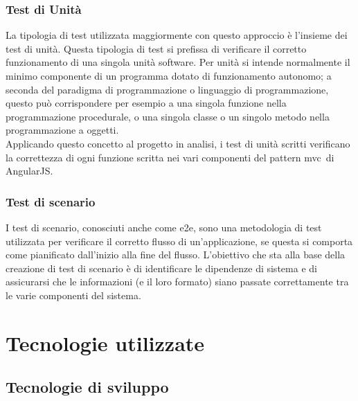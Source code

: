 \subsubsection{Test di Unità}
La tipologia di test utilizzata maggiormente con questo approccio è l'insieme dei test di unità. Questa tipologia di test si prefissa di verificare il corretto funzionamento di una singola unità software. Per unità si intende normalmente il minimo componente di un programma dotato di funzionamento autonomo; a seconda del paradigma di programmazione o linguaggio di programmazione, questo può corrispondere per esempio a una singola funzione nella programmazione procedurale, o una singola classe o un singolo metodo nella programmazione a oggetti.\\
Applicando questo concetto al progetto in analisi, i test di unità scritti verificano la correttezza di ogni funzione scritta nei vari componenti del pattern \gls{mvc}\glsfirstoccur\  di AngularJS. 

\subsubsection{Test di scenario}
I test di scenario, conosciuti anche come \gls{e2e}, sono una metodologia di test utilizzata per verificare il corretto flusso di un’applicazione, se questa si comporta come pianificato dall’inizio alla fine del flusso. L’obiettivo che sta alla base della creazione di test di scenario è di identificare  le dipendenze di sistema e di assicurarsi che le informazioni (e il loro formato) siano passate correttamente tra le varie componenti del sistema.


\section{Tecnologie utilizzate}
\subsection{Tecnologie di sviluppo}
